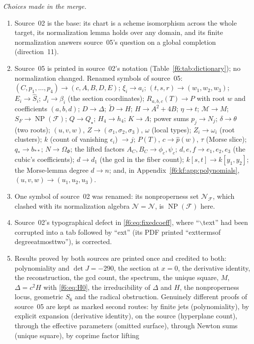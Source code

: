 \documentclass[11pt,a4paper]{article}
\theoremstyle{definition}
\newcommand{\F}{\mathcal F}
\newcommand{\normal}{\mathcal N}
\newcommand{\NP}{\operatorname{NP}}
\begin{document}
\emph{Choices made in the merge.}
\begin{enumerate}[label=\textup{(\arabic*)}]
\item Source~02 is the base: its chart is a scheme isomorphism across the
whole target, its normalization lemma holds over any domain, and its finite
normalization answers source~05's question on a global completion
(direction~11).
\item Source~05 is printed in source~02's notation (Table~\ref{f6:tab:dictionary});
no normalization changed. Renamed symbols of source~05: $(C,p_1,\dots,p_4)\to
(c,A,B,D,E)$; $\xi_i\to a_i$; $(t,s,r)\to(w_1,w_2,w_3)$; $E_i\to\widehat S_i$;
$J_i\to\beta_i$ (the section coordinates); $R_{a,b,c}(T)\to P$ with root $w$ and
coefficients $(a,b,d)$; $D\to\Delta$; $\widetilde D\to H$; $H\to A^2+4B$;
$\eta\to t$; $\mathcal M\to M$; $S_F\to\NP(\F)$; $Q\to Q_\star$;
$H_4\to h_4$; $K\to\Lambda$; power sums $p_j\to N_j$; $\delta\to\theta$ (two
roots); $(u,v,w)$, $Z\to(\sigma_1,\sigma_2,\sigma_3)$, $\omega$ (local types);
$Z_i\to\omega_i$ (root clusters); $k$ (count of vanishing $\epsilon_i$) $\to j$;
$P(T)$, $c\to\hat p(w)$, $\tau$ (Morse slice); $q_*\to b_{**}$; $N\to\Omega_\Phi$;
the lifted factors $A_C,B_C\to\phi_c,\psi_c$; $d,e,f\to e_1,e_2,e_3$ (the
cubic's coefficients); $d\to d_1$ (the gcd in the fiber count);
$k[s,t]\to k[y_1,y_2]$; the
Morse-lemma degree $d\to n$; and, in Appendix~\ref{f6:kf:app:polynomials},
$(u,v,w)\to(u_1,u_2,u_3)$.
\item One symbol of source~02 was renamed: its nonproperness set
$\mathcal N_{\F}$, which clashed with its normalization algebra
$\normal=\mathcal N$, is $\NP(\F)$ here.
\item Source~02's typographical defect in \eqref{f6:eq:fixedcoeff}, where
``$\backslash$text'' had been corrupted into a tab followed by ``ext'' (its
PDF printed ``exttermsof degreeatmosttwo''), is corrected.
\item Results proved by both sources are printed once and credited to both:
polynomiality and $\det J=-290$, the section at $x=0$, the derivative
identity, the reconstruction, the gcd count, the spectrum, the unique square,
$M$, $\Delta=c^2H$ with \eqref{f6:eq:H0}, the irreducibility of $\Delta$ and
$H$, the nonproperness locus, geometric $S_6$ and the radical obstruction.
Genuinely different proofs of source~05 are kept as marked second routes:
by finite jets (polynomiality), by explicit expansion (derivative identity),
on the source (hyperplane count), through the effective parameters (omitted
surface), through Newton sums (unique square), by coprime factor lifting

\end{enumerate}
\end{document}
